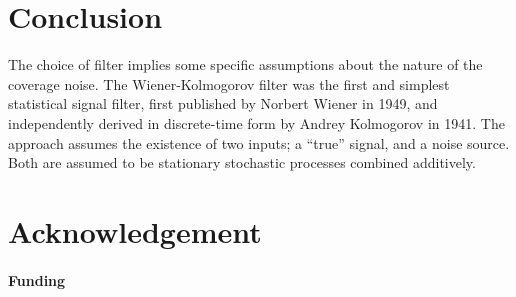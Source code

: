\documentclass{bioinfo}
\begin{document}
\section{Conclusion}
The choice of filter implies some specific assumptions about the
nature of the coverage noise. The Wiener-Kolmogorov filter was the
first and simplest statistical signal filter, first published by
Norbert Wiener in 1949, and independently derived in discrete-time
form by Andrey Kolmogorov in 1941. The approach assumes the existence
of two inputs; a ``true'' signal, and a noise source. Both are assumed
to be stationary stochastic processes combined additively. 

\section*{Acknowledgement}
\paragraph{Funding\textcolon}










\end{document}
